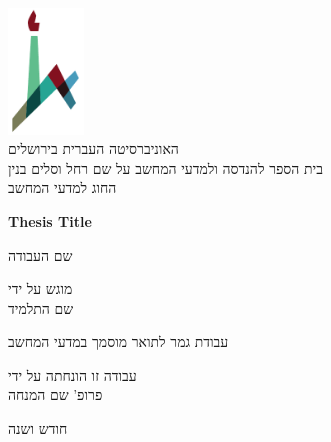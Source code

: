 \begin{titlepage}
    \begin{center}
        \vspace*{1cm}
        
        \includegraphics[width=0.15\textwidth]{huji_logo_notext.pdf}\\
        האוניברסיטה העברית בירושלים\\
        בית הספר להנדסה ולמדעי המחשב על שם רחל וסלים בנין\\
        החוג למדעי המחשב
        \vspace{2cm}
        
        {\Large \textbf{Thesis Title}}
        
        \vspace{1cm}
        {\Large שם העבודה}
        
        \vspace{1.5cm}

        מוגש על ידי\\
        שם התלמיד
        \vspace{1cm}
        
        עבודת גמר לתואר מוסמך במדעי המחשב
        
        \vspace{1cm}
        
        עבודה זו הונחתה על ידי\\
        פרופ' שם המנחה
        
        \vfill
        
        חודש ושנה
    \end{center}
\end{titlepage}